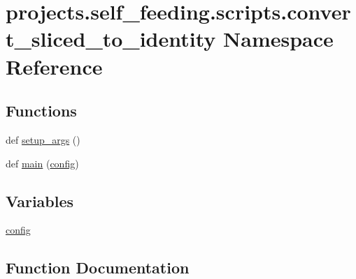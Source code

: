 \hypertarget{namespaceprojects_1_1self__feeding_1_1scripts_1_1convert__sliced__to__identity}{}\section{projects.\+self\+\_\+feeding.\+scripts.\+convert\+\_\+sliced\+\_\+to\+\_\+identity Namespace Reference}
\label{namespaceprojects_1_1self__feeding_1_1scripts_1_1convert__sliced__to__identity}
\subsection*{Functions}
\begin{DoxyCompactItemize}
\item 
def \hyperlink{namespaceprojects_1_1self__feeding_1_1scripts_1_1convert__sliced__to__identity_aea494b2057e7cfdbd2ecd268327400c4}{setup\+\_\+args} ()
\item 
def \hyperlink{namespaceprojects_1_1self__feeding_1_1scripts_1_1convert__sliced__to__identity_a330625b0a6e9b8fc90da17503b083312}{main} (\hyperlink{namespaceprojects_1_1self__feeding_1_1scripts_1_1convert__sliced__to__identity_a33616a4dd26d8519ee4fcde480fc5fc2}{config})
\end{DoxyCompactItemize}
\subsection*{Variables}
\begin{DoxyCompactItemize}
\item 
\hyperlink{namespaceprojects_1_1self__feeding_1_1scripts_1_1convert__sliced__to__identity_a33616a4dd26d8519ee4fcde480fc5fc2}{config}
\end{DoxyCompactItemize}


\subsection{Function Documentation}
\mbox{\label{namespaceprojects_1_1self__feeding_1_1scripts_1_1convert__sliced__to__identity_a330625b0a6e9b8fc90da17503b083312}} 
